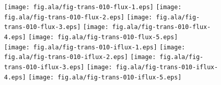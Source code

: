 \documentclass[a4paper,preprint,unsortedaddress,onecolumn]{revtex4-1}
\begin{document}
\begin{figure}
  \centering
  \texttt{[image: fig.ala/fig-trans-010-flux-1.eps]}
  \texttt{[image: fig.ala/fig-trans-010-flux-2.eps]}
  \texttt{[image: fig.ala/fig-trans-010-flux-3.eps]}
  \texttt{[image: fig.ala/fig-trans-010-flux-4.eps]}
  \texttt{[image: fig.ala/fig-trans-010-flux-5.eps]}\\
  \texttt{[image: fig.ala/fig-trans-010-iflux-1.eps]}
  \texttt{[image: fig.ala/fig-trans-010-iflux-2.eps]}
  \texttt{[image: fig.ala/fig-trans-010-iflux-3.eps]}
  \texttt{[image: fig.ala/fig-trans-010-iflux-4.eps]}
  \texttt{[image: fig.ala/fig-trans-010-iflux-5.eps]}

\end{figure}
\end{document}

